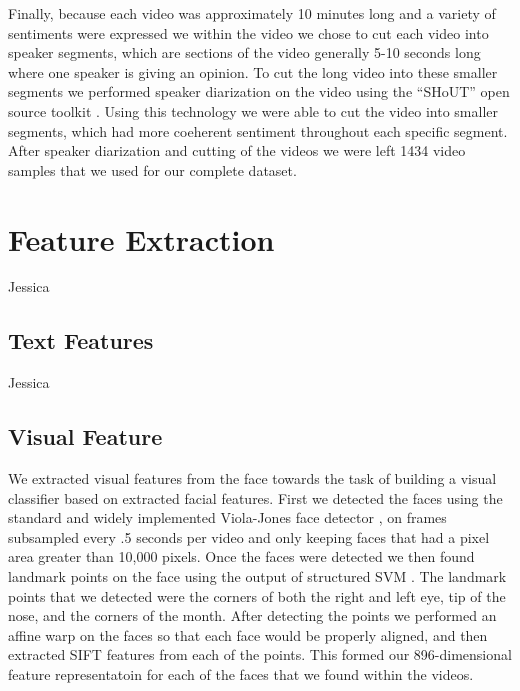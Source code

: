 \documentclass[twoside]{article}
\begin{document}
\begin{multicols}{2}
Finally, because each video was approximately 10 minutes long and a variety of sentiments were expressed we within the video we chose to cut each video into speaker segments, which are sections of the video generally 5-10 seconds long where one speaker is giving an opinion.
To cut the long video into these smaller segments we performed speaker diarization on the video using the ``SHoUT'' open source toolkit \cite{huj}.
Using this technology we were able to cut the video into smaller segments, which had more coeherent sentiment throughout each specific segment.
After speaker diarization and cutting of the videos we were left 1434 video samples that we used for our complete dataset.





\section{Feature Extraction}
Jessica

\subsection{Text Features}
Jessica

\subsection{Visual Feature}
We extracted visual features from the face towards the task of building a visual classifier based on extracted facial features.
First we detected the faces using the standard and widely implemented Viola-Jones face detector \cite{violajones}, on frames subsampled every .5 seconds per video and only keeping faces that had a pixel area greater than 10,000 pixels.
Once the faces were detected we then found landmark points on the face using the output of structured SVM \cite{flandmark}.
The landmark points that we detected were the corners of both the right and left eye, tip of the nose, and the corners of the month.
After detecting the points we performed an affine warp on the faces so that each face would be properly aligned, and then extracted SIFT \cite{Lowe} features from each of the points.
This formed our 896-dimensional feature representatoin for each of the faces that we found within the videos.


\end{multicols}
\end{document}
